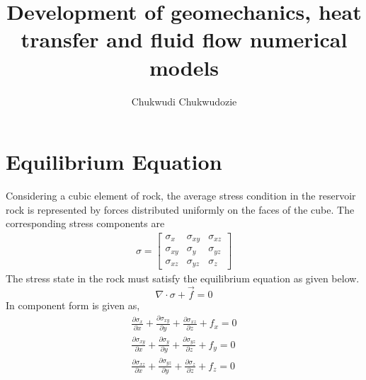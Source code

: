 \documentclass[12pt]{article}
\author{Chukwudi Chukwudozie}
\title{Development of geomechanics, heat transfer and fluid flow numerical models}
\begin{document}
\date{}
\maketitle
\tableofcontents
\clearpage
{}


\section{Equilibrium Equation}
Considering a cubic element of rock, the average stress condition in the reservoir rock is represented by forces distributed uniformly  on the faces of the cube. The corresponding stress components are
\newline
\begin{gather}		\label{eq4}
\sigma = \left[
\begin{array}{ccc}
\sigma_x & \sigma_{xy} & \sigma_{xz} 	\\
\sigma_{xy} & \sigma_y & \sigma_{yz}	\\
\sigma_{xz} & \sigma_{yz} & \sigma_z
\end{array}
\right]
\end{gather}
\newline
The stress state in the rock must satisfy the equilibrium equation as given below.
%
\begin{equation}			\label{eq5}
\nabla\cdot\sigma+\vec{f}=0
\end{equation}
In component form is given as,
 \begin{equation}				\label{eq6}				
 \begin{split}
\frac{\partial \sigma_x}{\partial x} + \frac{\partial \sigma _{xy}}{\partial y} + \frac{\partial \sigma _{xz}}{\partial z} + f_x = 0		\\
\frac{\partial \sigma_{xy}}{\partial x} + \frac{\partial \sigma _y}{\partial y} + \frac{\partial \sigma _{yz}}{\partial z} + f_y = 0		\\
%
\frac{\partial \sigma_{xz}}{\partial x} + \frac{\partial \sigma _{yz}}{\partial y} + \frac{\partial \sigma _z}{\partial z} + f_z = 0	
\end{split}
\end{equation}
\end{document}

